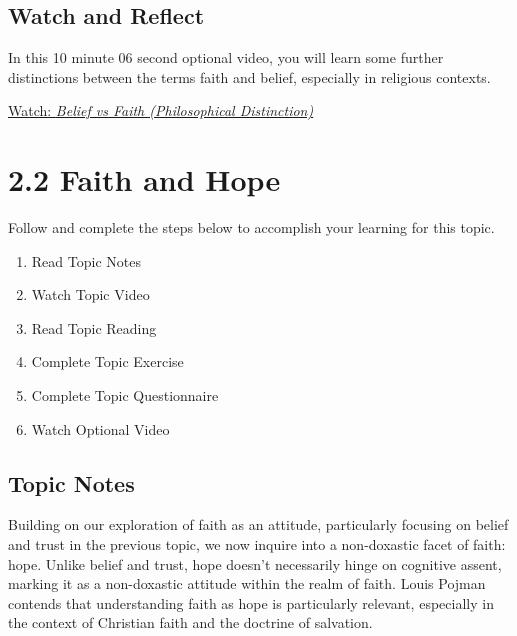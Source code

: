 \documentclass[
]{book}
\providecommand{\tightlist}{%
  \setlength{\itemsep}{0pt}\setlength{\parskip}{0pt}}
\begin{document}
\hypertarget{watch-and-reflect-9}{%
\subsection*{Watch and Reflect}\label{watch-and-reflect-9}}

\begin{reflect}
In this 10 minute 06 second optional video, you will learn some further distinctions between the terms faith and belief, especially in religious contexts.

\href{https://www.youtube.com/watch?v=o8QKkHWUSu0}{Watch: \emph{Belief vs Faith (Philosophical Distinction)}}
\end{reflect}

\hypertarget{faith-and-hope}{%
\section*{2.2 Faith and Hope}\label{faith-and-hope}}

Follow and complete the steps below to accomplish your learning for this topic.

\begin{enumerate}
\def\labelenumi{\arabic{enumi}.}
\tightlist
\item
  Read Topic Notes
\item
  Watch Topic Video
\item
  Read Topic Reading
\item
  Complete Topic Exercise
\item
  Complete Topic Questionnaire
\item
  Watch Optional Video
\end{enumerate}

\hypertarget{topic-notes-5}{%
\subsection*{Topic Notes}\label{topic-notes-5}}

Building on our exploration of faith as an attitude, particularly focusing on belief and trust in the previous topic, we now inquire into a non-doxastic facet of faith: hope. Unlike belief and trust, hope doesn't necessarily hinge on cognitive assent, marking it as a non-doxastic attitude within the realm of faith. Louis Pojman contends that understanding faith as hope is particularly relevant, especially in the context of Christian faith and the doctrine of salvation.
\end{document}
